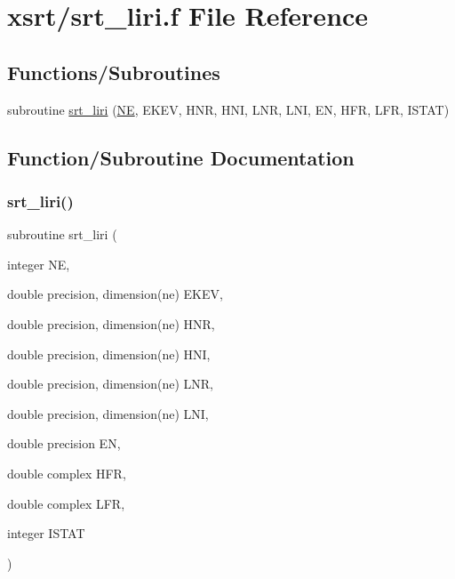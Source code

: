 \hypertarget{srt__liri_8f}{}\section{xsrt/srt\+\_\+liri.f File Reference}
\label{srt__liri_8f}
\subsection*{Functions/\+Subroutines}
\begin{DoxyCompactItemize}
\item 
subroutine \hyperlink{srt__liri_8f_af62d64ac8b722c4da0f38e726937de06}{srt\+\_\+liri} (\hyperlink{eval__tab_8h_a5af9139e882aef6c820ae908589a40d6}{NE}, E\+K\+EV, H\+NR, H\+NI, L\+NR, L\+NI, EN, H\+FR, L\+FR, I\+S\+T\+AT)
\end{DoxyCompactItemize}


\subsection{Function/\+Subroutine Documentation}
\mbox{\label{srt__liri_8f_af62d64ac8b722c4da0f38e726937de06}} 
\subsubsection{\texorpdfstring{srt\+\_\+liri()}{srt\_liri()}}
{\footnotesize\ttfamily subroutine srt\+\_\+liri (\begin{DoxyParamCaption}\item[{integer}]{NE,  }\item[{double precision, dimension(ne)}]{E\+K\+EV,  }\item[{double precision, dimension(ne)}]{H\+NR,  }\item[{double precision, dimension(ne)}]{H\+NI,  }\item[{double precision, dimension(ne)}]{L\+NR,  }\item[{double precision, dimension(ne)}]{L\+NI,  }\item[{double precision}]{EN,  }\item[{double complex}]{H\+FR,  }\item[{double complex}]{L\+FR,  }\item[{integer}]{I\+S\+T\+AT }\end{DoxyParamCaption})}

